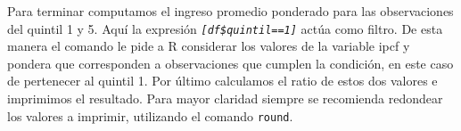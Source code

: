 \documentclass[
]{book}
\newenvironment{Shaded}{\begin{snugshade}}{\end{snugshade}}
\newcommand{\DecValTok}[1]{\textcolor[rgb]{0.00,0.00,0.81}{#1}}
\newcommand{\FloatTok}[1]{\textcolor[rgb]{0.00,0.00,0.81}{#1}}
\newcommand{\FunctionTok}[1]{\textcolor[rgb]{0.00,0.00,0.00}{#1}}
\newcommand{\NormalTok}[1]{#1}
\newcommand{\OtherTok}[1]{\textcolor[rgb]{0.56,0.35,0.01}{#1}}
\newcommand{\SpecialCharTok}[1]{\textcolor[rgb]{0.00,0.00,0.00}{#1}}
\begin{document}
\begin{Shaded}
\end{Shaded}

Para terminar computamos el ingreso promedio ponderado para las observaciones del quintil 1 y 5. Aquí la expresión \emph{\texttt{{[}df\$quintil==1{]}}} actúa como filtro. De esta manera el comando le pide a R considerar los valores de la variable ipcf y pondera que corresponden a observaciones que cumplen la condición, en este caso de pertenecer al quintil 1. Por último calculamos el ratio de estos dos valores e imprimimos el resultado. Para mayor claridad siempre se recomienda redondear los valores a imprimir, utilizando el comando \texttt{round}.
\end{document}
